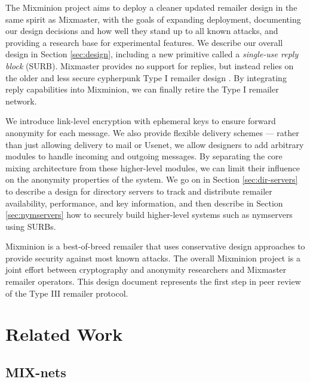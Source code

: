 \documentclass{llncs}
\begin{document}
The Mixminion project aims to deploy a cleaner updated remailer design
in the same spirit as Mixmaster, with the goals of expanding
deployment, documenting our design decisions and how well they stand
up to all known attacks, and providing a research base for
experimental features. We describe our overall design in Section
\ref{sec:design}, including a new primitive called a \emph{single-use
reply block} (SURB).  Mixmaster provides no support for replies, but
instead relies on the older and less secure cypherpunk Type I remailer
design \cite{remailer-history}. By integrating reply capabilities into
Mixminion, we can finally retire the Type I remailer network.

We introduce link-level encryption with ephemeral keys to ensure forward
anonymity for each message. We also provide flexible delivery schemes ---
rather than just allowing delivery to mail or Usenet, we allow designers
to add arbitrary modules to handle incoming and outgoing messages. By
separating the core mixing architecture from these higher-level modules,
we can limit their influence on the anonymity properties of the system. We
go on in Section \ref{sec:dir-servers} to describe a design for directory
servers to track and distribute remailer availability, performance,
and key information, and then describe in Section \ref{sec:nymservers}
how to securely build higher-level systems such as nymservers using SURBs.

Mixminion is a best-of-breed remailer that uses conservative design
approaches to provide security against most known attacks. The overall
Mixminion project is a joint effort between cryptography and anonymity
researchers and Mixmaster remailer operators. This design document
represents the first step in peer review of the Type III remailer
protocol.



\section{Related Work}

\subsection{MIX-nets}
\end{document}
